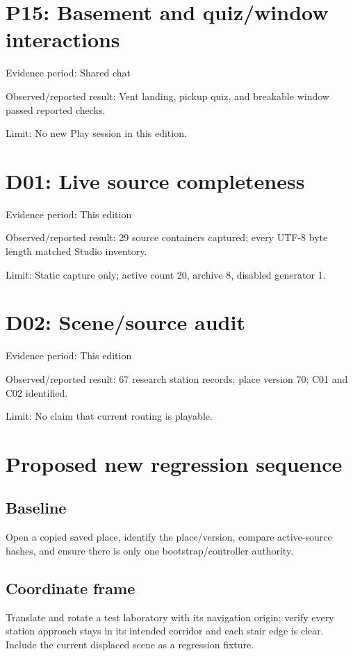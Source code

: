 \section{P15: Basement and quiz/\allowbreak{}window interactions}
Evidence period: Shared chat

Observed/\allowbreak{}reported result: Vent landing, pickup quiz, and breakable window passed reported checks.\allowbreak{}

Limit: No new Play session in this edition.\allowbreak{}

\section{D01: Live source completeness}
Evidence period: This edition

Observed/\allowbreak{}reported result: 29 source containers captured; every UTF-8 byte length matched Studio inventory.\allowbreak{}

Limit: Static capture only; active count 20, archive 8, disabled generator 1.\allowbreak{}

\section{D02: Scene/\allowbreak{}source audit}
Evidence period: This edition

Observed/\allowbreak{}reported result: 67 research station records; place version 70; C01 and C02 identified.\allowbreak{}

Limit: No claim that current routing is playable.\allowbreak{}

\section{Proposed new regression sequence}
\subsection{Baseline}
Open a copied saved place, identify the place/\allowbreak{}version, compare active-source hashes, and ensure there is only one bootstrap/\allowbreak{}controller authority.\allowbreak{}

\subsection{Coordinate frame}
Translate and rotate a test laboratory with its navigation origin; verify every station approach stays in its intended corridor and each stair edge is clear.\allowbreak{} Include the current displaced scene as a regression fixture.\allowbreak{}

